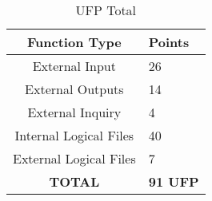 \begin{table}[!htbp]
\caption{UFP Total}
\begin{tabularx}{\textwidth}{|c|X|}
\hline
\textbf{Function Type}      &  \textbf{Points}
\\ \hline
External Input		& 26
\\ \hline
External Outputs & 14
\\ \hline
External Inquiry & 4
\\ \hline
Internal Logical Files & 40
\\ \hline
External Logical Files & 7
\\ \hline
\textbf{TOTAL} & \textbf{91 UFP}
\\ \hline


\end{tabularx}
\end{table}




